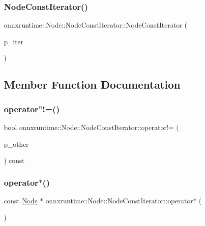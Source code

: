 \subsubsection{\texorpdfstring{Node\+Const\+Iterator()}{NodeConstIterator()}}
{\footnotesize\ttfamily onnxruntime\+::\+Node\+::\+Node\+Const\+Iterator\+::\+Node\+Const\+Iterator (\begin{DoxyParamCaption}\item[{\mbox{\hyperlink{classonnxruntime_1_1Node_ae0df52e26b0237505b6a0cbc25106d9d}{Edge\+Const\+Iterator}}}]{p\+\_\+iter }\end{DoxyParamCaption})}



\subsection{Member Function Documentation}
\mbox{\label{classonnxruntime_1_1Node_1_1NodeConstIterator_a8d30289ab0ccb7ff71fec635ad788c4c}} 
\subsubsection{\texorpdfstring{operator"!=()}{operator!=()}}
{\footnotesize\ttfamily bool onnxruntime\+::\+Node\+::\+Node\+Const\+Iterator\+::operator!= (\begin{DoxyParamCaption}\item[{const \mbox{\hyperlink{classonnxruntime_1_1Node_1_1NodeConstIterator}{Node\+Const\+Iterator}} \&}]{p\+\_\+other }\end{DoxyParamCaption}) const}

\mbox{\label{classonnxruntime_1_1Node_1_1NodeConstIterator_abe0250a7466f7661fb85fada5624d645}} 
\subsubsection{\texorpdfstring{operator$\ast$()}{operator*()}}
{\footnotesize\ttfamily const \mbox{\hyperlink{classonnxruntime_1_1Node}{Node}} $\ast$ onnxruntime\+::\+Node\+::\+Node\+Const\+Iterator\+::operator$\ast$ (\begin{DoxyParamCaption}{ }\end{DoxyParamCaption})}

